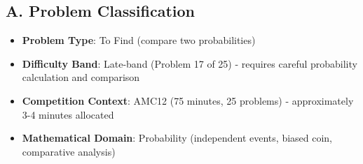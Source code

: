 \documentclass[]{article}
\begin{document}
\begin{problemconfigbox}
\subsection*{A. Problem Classification}
\begin{itemize}[leftmargin=*]
    \item \textbf{Problem Type}: To Find (compare two probabilities)
    \item \textbf{Difficulty Band}: Late-band (Problem 17 of 25) - requires careful probability calculation and comparison
    \item \textbf{Competition Context}: AMC12 (75 minutes, 25 problems) - approximately 3-4 minutes allocated
    \item \textbf{Mathematical Domain}: Probability (independent events, biased coin, comparative analysis)
\end{itemize}


\end{problemconfigbox}
\end{document}
